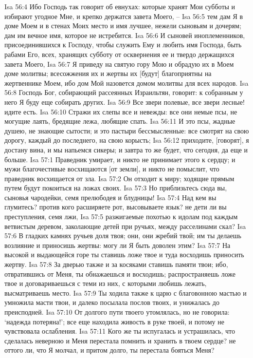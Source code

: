 Isa 56:4  Ибо Господь так говорит об евнухах: которые хранят Мои субботы и избирают угодное Мне, и крепко держатся завета Моего, --
Isa 56:5  тем дам Я в доме Моем и в стенах Моих место и имя лучшее, нежели сыновьям и дочерям; дам им вечное имя, которое не истребится.
Isa 56:6  И сыновей иноплеменников, присоединившихся к Господу, чтобы служить Ему и любить имя Господа, быть рабами Его, всех, хранящих субботу от осквернения ее и твердо держащихся завета Моего,
Isa 56:7  Я приведу на святую гору Мою и обрадую их в Моем доме молитвы; всесожжения их и жертвы их [будут] благоприятны на жертвеннике Моем, ибо дом Мой назовется домом молитвы для всех народов.
Isa 56:8  Господь Бог, собирающий рассеянных Израильтян, говорит: к собранным у него Я буду еще собирать других.
Isa 56:9  Все звери полевые, все звери лесные! идите есть.
Isa 56:10  Стражи их слепы все и невежды: все они немые псы, не могущие лаять, бредящие лежа, любящие спать.
Isa 56:11  И это псы, жадные душею, не знающие сытости; и это пастыри бессмысленные: все смотрят на свою дорогу, каждый до последнего, на свою корысть;
Isa 56:12  приходите, [говорят], я достану вина, и мы напьемся сикеры; и завтра то же будет, что сегодня, да еще и больше.
Isa 57:1  Праведник умирает, и никто не принимает этого к сердцу; и мужи благочестивые восхищаются [от земли], и никто не помыслит, что праведник восхищается от зла.
Isa 57:2  Он отходит к миру; ходящие прямым путем будут покоиться на ложах своих.
Isa 57:3  Но приблизьтесь сюда вы, сыновья чародейки, семя прелюбодея и блудницы!
Isa 57:4  Над кем вы глумитесь? против кого расширяете рот, высовываете язык? не дети ли вы преступления, семя лжи,
Isa 57:5  разжигаемые похотью к идолам под каждым ветвистым деревом, заколающие детей при ручьях, между расселинами скал?
Isa 57:6  В гладких камнях ручьев доля твоя; они, они жребий твой; им ты делаешь возлияние и приносишь жертвы: могу ли Я быть доволен этим?
Isa 57:7  На высокой и выдающейся горе ты ставишь ложе твое и туда восходишь приносить жертву.
Isa 57:8  За дверью также и за косяками ставишь памяти твои; ибо, отвратившись от Меня, ты обнажаешься и восходишь; распространяешь ложе твое и договариваешься с теми из них, с которыми любишь лежать, высматриваешь место.
Isa 57:9  Ты ходила также к царю с благовонною мастью и умножила масти твои, и далеко посылала послов твоих, и унижалась до преисподней.
Isa 57:10  От долгого пути твоего утомлялась, но не говорила: `надежда потеряна!'; все еще находила живость в руке твоей, и потому не чувствовала ослабления.
Isa 57:11  Кого же ты испугалась и устрашилась, что сделалась неверною и Меня перестала помнить и хранить в твоем сердце? не оттого ли, что Я молчал, и притом долго, ты перестала бояться Меня?
